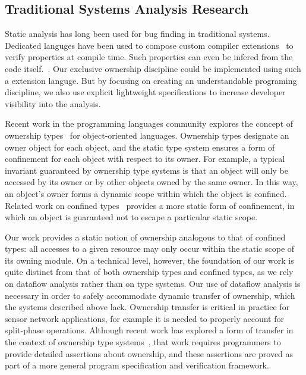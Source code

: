 \subsection{Traditional Systems Analysis Research}



Static analysis has long been used for bug finding in traditional systems.
%
Dedicated languges have been used to compose custom compiler
extensions~\cite{engler00checking} to verify properties at compile time.
%
Such properties can even be infered from the code
itself.~\cite{kremenek06from}.
%
Our exclusive ownership discipline could be implemented using such a
extension languge.
%
But by focusing on creating an understandable programing discipline, we also
use explicit lightweight specifications to increase developer visibility
into the analysis.



Recent work in the programming languages community explores the concept of
ownership types~\cite{ownership,ownership2,BoyapatiEtAl02,aliasjava} for
object-oriented languages. 
%
Ownership types designate an owner object for each object, and the static
type system ensures a form of confinement for each object with respect to
its owner.  
%
For example, a typical invariant guaranteed by ownership type systems is
that an object will only be accessed by its owner or by other objects owned
by the same owner.  
%
In this way, an object's owner forms a dynamic scope within which the object
is confined.  
%
Related work on confined types~\cite{confined1,confined2} provides a more
static form of confinement, in which an object is guaranteed not to escape a
particular static scope.



Our work provides a static notion of ownership analogous to that of confined
types:  all accesses to a given resource may only occur within the static
scope of its owning module.  
%
On a technical level, however, the foundation of our work is quite distinct
from that of both ownership types and confined types, as we rely on dataflow
analysis rather than on type systems.  
%
Our use of dataflow analysis is necessary in order to safely accommodate
dynamic transfer of ownership, which the systems described above lack.  
%
Ownership transfer is critical in practice for sensor network applications,
for example it is needed to properly account for split-phase operations.  
%
Although recent work has explored a form of transfer in the context of
ownership type systems~\cite{DBLP:conf/ecoop/BanerjeeN05}, that work
requires programmers to provide detailed assertions about ownership, and
these assertions are proved as part of a more general program specification
and verification framework.



